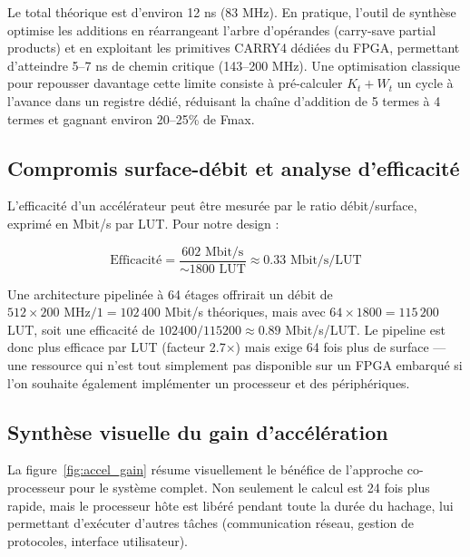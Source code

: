 Le total théorique est d'environ 12 ns (83 MHz). En pratique, l'outil de synthèse optimise les additions en réarrangeant l'arbre d'opérandes (carry-save partial products) et en exploitant les primitives CARRY4 dédiées du FPGA, permettant d'atteindre 5--7 ns de chemin critique (143--200 MHz). Une optimisation classique pour repousser davantage cette limite consiste à pré-calculer $K_t + W_t$ un cycle à l'avance dans un registre dédié, réduisant la chaîne d'addition de 5 termes à 4 termes et gagnant environ 20--25\% de Fmax.

\subsection{Compromis surface-débit et analyse d'efficacité}

L'efficacité d'un accélérateur peut être mesurée par le ratio débit/surface, exprimé en Mbit/s par LUT. Pour notre design :

\[
\text{Efficacité} = \frac{602 \text{ Mbit/s}}{{\sim}1800 \text{ LUT}} \approx 0.33 \text{ Mbit/s/LUT}
\]

Une architecture pipelinée à 64 étages offrirait un débit de $512 \times 200\text{ MHz} / 1 = 102\,400$ Mbit/s théoriques, mais avec $64 \times 1800 = 115\,200$ LUT, soit une efficacité de $102400/115200 \approx 0.89$ Mbit/s/LUT. Le pipeline est donc plus efficace par LUT (facteur 2.7$\times$) mais exige 64 fois plus de surface --- une ressource qui n'est tout simplement pas disponible sur un FPGA embarqué si l'on souhaite également implémenter un processeur et des périphériques.

\subsection{Synthèse visuelle du gain d'accélération}

La figure~\ref{fig:accel_gain} résume visuellement le bénéfice de l'approche co-processeur pour le système complet. Non seulement le calcul est 24 fois plus rapide, mais le processeur hôte est libéré pendant toute la durée du hachage, lui permettant d'exécuter d'autres tâches (communication réseau, gestion de protocoles, interface utilisateur).


